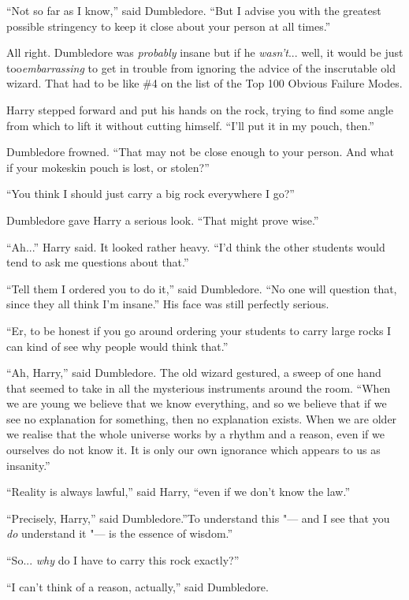 ``Not so far as I know,'' said Dumbledore. ``But I advise you with the
greatest possible stringency to keep it close about your person at all
times.''

All right. Dumbledore was \emph{probably} insane but if he
\emph{wasn't}... well, it would be just too\emph{embarrassing} to
get in trouble from ignoring the advice of the inscrutable old wizard.
That had to be like \#4 on the list of the Top 100 Obvious Failure
Modes.

Harry stepped forward and put his hands on the rock, trying to find some
angle from which to lift it without cutting himself. ``I'll put it in my
pouch, then.''

Dumbledore frowned. ``That may not be close enough to your person. And
what if your mokeskin pouch is lost, or stolen?''

``You think I should just carry a big rock everywhere I go?''

Dumbledore gave Harry a serious look. ``That might prove wise.''

``Ah...'' Harry said. It looked rather heavy. ``I'd think the other
students would tend to ask me questions about that.''

``Tell them I ordered you to do it,'' said Dumbledore. ``No one will
question that, since they all think I'm insane.'' His face was still
perfectly serious.

``Er, to be honest if you go around ordering your students to carry
large rocks I can kind of see why people would think that.''

``Ah, Harry,'' said Dumbledore. The old wizard gestured, a sweep of one
hand that seemed to take in all the mysterious instruments around the
room. ``When we are young we believe that we know everything, and so we
believe that if we see no explanation for something, then no explanation
exists. When we are older we realise that the whole universe works by a
rhythm and a reason, even if we ourselves do not know it. It is only our
own ignorance which appears to us as insanity.''

``Reality is always lawful,'' said Harry, ``even if we don't know the
law.''

``Precisely, Harry,'' said Dumbledore.''To understand this "--- and I see
that you \emph{do} understand it "--- is the essence of wisdom.''

``So... \emph{why} do I have to carry this rock exactly?''

``I can't think of a reason, actually,'' said Dumbledore.

